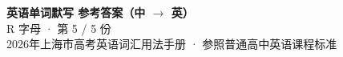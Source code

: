 \documentclass[10pt,a4paper]{article}
\begin{document}
\pagestyle{plain}

\begin{center}
{\LARGE\bfseries 英语单词默写 \quad 参考答案（中 $\to$ 英）}\\[0.22em]
{\large R 字母 · 第 5 / 5 份}\\[0.18em]
{\small 2026年上海市高考英语词汇用法手册 · 参照普通高中英语课程标准}
\end{center}

\vspace{0.2em}
\noindent{\color{rulegray}\rule{\textwidth}{0.8pt}}

\vspace{0.35em}

\vspace{0.25em}
\renewcommand{\arraystretch}{1.32}
\end{document}
